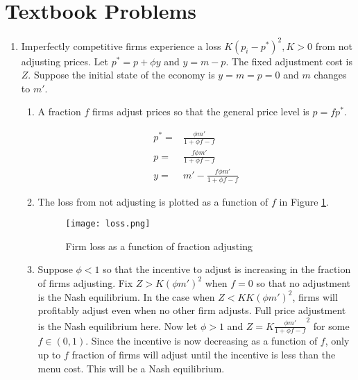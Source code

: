 \documentclass[11pt]{article}
\begin{document}
\section{Textbook Problems}

    \begin{enumerate}

        \item Imperfectly competitive firms experience a loss $K(p_i - p^*)^2, K > 0$ from not adjusting prices. Let $p^* = p + \phi y$ and $y = m - p$. The fixed adjustment cost is $Z$. Suppose the initial state of the economy is $y = m = p = 0$ and $m$ changes to $m'$.

        \begin{enumerate}

            \item A fraction $f$ firms adjust prices so that the general price level is $p = f p^*$.

                \begin{align*}
                    p^* = & \frac{\phi m'}{1 + \phi f - f} \\
                    p = & \frac{f \phi m'}{1 + \phi f - f} \\
                    y = & m' - \frac{f \phi m'}{1 + \phi f - f}
                \end{align*}

            \item The loss from not adjusting is plotted as a function of $f$ in Figure \ref{fig:loss}.

            \begin{figure}[h]
                \centering
                \caption{Firm loss as a function of fraction adjusting}
                \label{fig:loss}
                \texttt{[image: loss.png]}
            \end{figure}

            \item Suppose $\phi < 1$ so that the incentive to adjust is increasing in the fraction of firms adjusting. Fix $Z > K(\phi m')^2$ when $f = 0$ so that no adjustment is the Nash equilibrium. In the case when $Z < KK(\phi m')^2$, firms will profitably adjust even when no other firm adjusts. Full price adjustment is the Nash equilibrium here. Now let $\phi > 1$ and $Z = K \frac{\phi m'}{1 + \phi f - f}^2$ for some $f \in (0,1)$. Since the incentive is now decreasing as a function of $f$, only up to $f$ fraction of firms will adjust until the incentive is less than the menu cost. This will be a Nash equilibrium.


\end{enumerate}
\end{enumerate}
\end{document}
